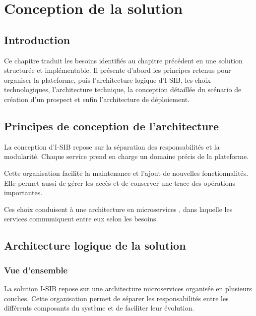\chapter{Conception de la solution}

\section*{Introduction}
{}

Ce chapitre traduit les besoins identifiés au chapitre précédent en une solution
structurée et implémentable. Il présente d'abord les principes retenus pour organiser
la plateforme, puis l'architecture logique d'I-SIB, les choix technologiques,
l'architecture technique, la conception détaillée du scénario de création d'un
prospect et enfin l'architecture de déploiement.

\section{Principes de conception de l'architecture}

La conception d'I-SIB repose sur la séparation des responsabilités et la
modularité. Chaque service prend en charge un domaine précis de la plateforme.

Cette organisation facilite la maintenance et l'ajout de nouvelles
fonctionnalités. Elle permet aussi de gérer les accès et de conserver une trace
des opérations importantes.

Ces choix conduisent à une architecture en microservices
\cite{fowler_microservices}, dans laquelle les services communiquent entre eux
selon les besoins.
\section{Architecture logique de la solution}


\subsection{Vue d'ensemble}

La solution I-SIB repose sur une architecture microservices organisée en plusieurs couches. Cette organisation permet de séparer les responsabilités entre les différents composants du système et de faciliter leur évolution.

